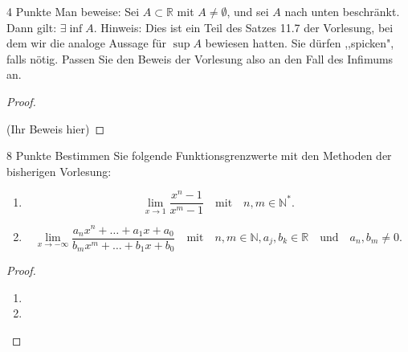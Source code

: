 \documentclass{../problemset}
\author{Michael van Straten}
\begin{document}
\maketitle


\begin{problem}{4 Punkte}
Man beweise: Sei $A \subset \mathbb{R}$ mit $A \neq \emptyset$, und sei $A$ nach unten beschränkt. Dann gilt: $\exists \inf A$.
Hinweis: Dies ist ein Teil des Satzes 11.7 der Vorlesung, bei dem wir die analoge Aussage für $\sup A$ bewiesen hatten. Sie dürfen ,,spicken", falls nötig. Passen Sie den Beweis der Vorlesung also an den Fall des Infimums an.
\begin{proof}
	$ $

	(Ihr Beweis hier)
\end{proof}
\end{problem}

\begin{problem}[Funktionsgrenzwerte]{8 Punkte}
Bestimmen Sie folgende Funktionsgrenzwerte mit den Methoden der bisherigen Vorlesung:
\begin{enumerate}
	\item \[
		      \lim_{x \to 1} \frac{x^n - 1}{x^m - 1} \quad \text{mit} \quad n, m \in \mathbb{N}^*.
	      \]
	\item \[
		      \lim_{x \to -\infty} \frac{a_nx^n + \ldots + a_1x + a_0}{b_mx^m + \ldots + b_1x + b_0} \quad \text{mit} \quad n, m \in \mathbb{N}, a_j, b_k \in \mathbb{R} \quad \text{und} \quad a_n, b_m \neq 0.
	      \]
\end{enumerate}
\begin{proof}
	$ $

	\begin{enumerate}
		\item
		\item
	\end{enumerate}
\end{proof}
\end{problem}
\end{document}
